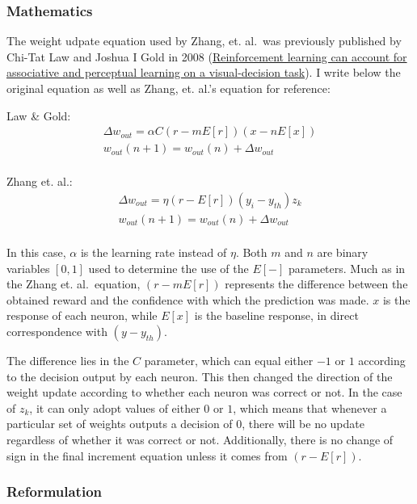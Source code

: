 \documentclass[11pt]{article}
\begin{document}
\hypertarget{mathematics}{%
\subsubsection{Mathematics}\label{mathematics}}

The weight udpate equation used by Zhang, et. al.~was previously
published by Chi-Tat Law and Joshua I Gold in 2008
(\href{http://europepmc.org/abstract/MED/19377473}{Reinforcement
learning can account for associative and perceptual learning on a
visual-decision task}). I write below the original equation as well as
Zhang, et. al.'s equation for reference:

Law \& Gold: \begin{align}
\Delta w_{out} = \alpha C(r - mE[r]) (x - nE[x]) \\
w_{out}(n + 1) = w_{out}(n) + \Delta w_{out} \\
\end{align}

Zhang et. al.: \begin{align}
\Delta w_{out} = \eta (r - E[r]) (y_i - y_{th}) z_k \\
w_{out}(n + 1) = w_{out}(n) + \Delta w_{out} \\
\end{align}

In this case, \(\alpha\) is the learning rate instead of \(\eta\). Both
\(m\) and \(n\) are binary variables \([0,1]\) used to determine the use
of the \(E[-]\) parameters. Much as in the Zhang et. al.~equation,
\((r - mE[r])\) represents the difference between the obtained reward
and the confidence with which the prediction was made. \(x\) is the
response of each neuron, while \(E[x]\) is the baseline response, in
direct correspondence with \((y - y_{th})\).

The difference lies in the \(C\) parameter, which can equal either
\(-1\) or \(1\) according to the decision output by each neuron. This
then changed the direction of the weight update according to whether
each neuron was correct or not. In the case of \(z_k\), it can only
adopt values of either \(0\) or \(1\), which means that whenever a
particular set of weights outputs a decision of 0, there will be no
update regardless of whether it was correct or not. Additionally, there
is no change of sign in the final increment equation unless it comes
from \((r - E[r])\).

\hypertarget{reformulation}{%
\subsubsection{Reformulation}\label{reformulation}}
\end{document}
